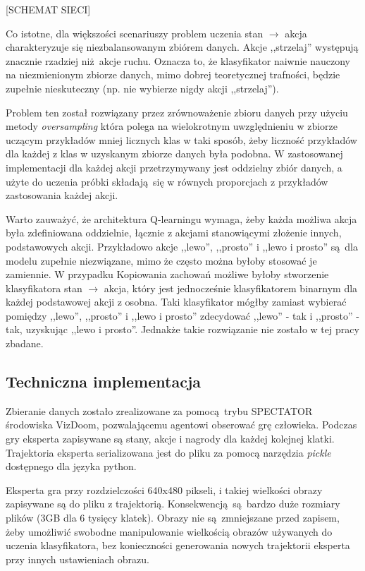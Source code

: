 [SCHEMAT SIECI]

Co istotne, dla większości scenariuszy problem uczenia stan $\to$ akcja charakteryzuje się niezbalansowanym zbiórem danych. Akcje ,,strzelaj'' występują znacznie rzadziej niż akcje ruchu. Oznacza to, że klasyfikator naiwnie nauczony na niezmienionym zbiorze danych, mimo dobrej teoretycznej trafności, będzie zupełnie nieskuteczny (np. nie wybierze nigdy akcji ,,strzelaj'').

Problem ten został rozwiązany przez zrównoważenie zbioru danych przy użyciu metody \textit{oversampling} która polega na wielokrotnym uwzględnieniu w zbiorze uczącym przykładów mniej licznych klas w taki sposób, żeby liczność przykładów dla każdej z klas w uzyskanym zbiorze danych była podobna. W zastosowanej implementacji dla każdej akcji przetrzymywany jest oddzielny zbiór danych, a użyte do uczenia próbki składają się w równych proporcjach z przykładów zastosowania każdej akcji. 

Warto zauważyć, że architektura Q-learningu wymaga, żeby każda możliwa akcja była zdefiniowana oddzielnie, łącznie z akcjami stanowiącymi złożenie innych, podstawowych akcji. Przykładowo akcje ,,lewo'', ,,prosto'' i ,,lewo i prosto'' są dla modelu zupełnie niezwiązane, mimo że często można byłoby stosować je zamiennie. W przypadku Kopiowania zachowań możliwe byłoby stworzenie klasyfikatora  stan $\to$ akcja, który jest jednocześnie klasyfikatorem binarnym dla każdej podstawowej akcji z osobna. Taki klasyfikator mógłby zamiast wybierać pomiędzy ,,lewo'', ,,prosto'' i ,,lewo i prosto'' zdecydować ,,lewo'' - tak i ,,prosto'' - tak, uzyskując ,,lewo i prosto''. Jednakże takie rozwiązanie nie zostało w tej pracy zbadane.

\subsection{Techniczna implementacja} \label{behavioral_cloning_tech}

Zbieranie danych zostało zrealizowane za pomocą trybu SPECTATOR środowiska VizDoom, pozwalającemu agentowi obserować grę człowieka. Podczas gry eksperta zapisywane są stany, akcje i nagrody dla każdej kolejnej klatki. Trajektoria eksperta serializowana jest do pliku za pomocą narzędzia \textit{pickle} dostępnego dla języka python.

Eksperta gra przy rozdzielczości 640x480 pikseli, i takiej wielkości obrazy zapisywane są do pliku z trajektorią. Konsekwencją są bardzo duże rozmiary plików (3GB dla 6 tysięcy klatek). Obrazy nie są zmniejszane przed zapisem, żeby umożliwić swobodne manipulowanie wielkością obrazów używanych do uczenia klasyfikatora, bez konieczności generowania nowych trajektorii eksperta przy innych ustawieniach obrazu.


